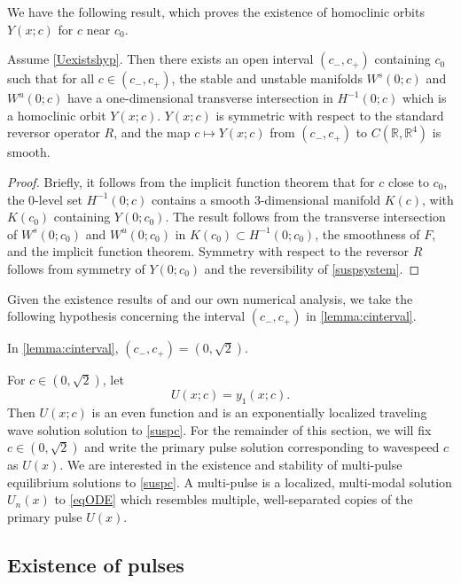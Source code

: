 \documentclass[review,onefignum,onetabnum]{siamart171218}
\newcommand{\R}{\mathbb{R}}
\begin{document}
We have the following result, which proves the existence of homoclinic orbits $Y(x; c)$ for $c$ near $c_0$.

\begin{lemma}\label{lemma:cinterval}
Assume \cref{Uexistshyp}. Then there exists an open interval $(c_-, c_+)$ containing $c_0$ such that for all $c \in (c_-, c_+)$, the stable and unstable manifolds $W^s(0; c)$ and $W^u(0; c)$ have a one-dimensional transverse intersection in $H^{-1}(0; c)$ which is a homoclinic orbit $Y(x; c)$. $Y(x; c)$ is symmetric with respect to the standard reversor operator $R$, and the map $c \mapsto Y(x; c)$ from $(c_-, c_+)$ to $C(\R, \R^4)$ is smooth.
\end{lemma}
\begin{proof}
Briefly, it follows from the implicit function theorem that for $c$ close to $c_0$, the 0-level set $H^{-1}(0; c)$ contains a smooth 3-dimensional manifold $K(c)$, with $K(c_0)$ containing $Y(0; c_0)$. The result follows from the transverse intersection of $W^s(0; c_0)$ and $W^u(0; c_0)$ in $K(c_0) \subset H^{-1}(0; c_0)$, the smoothness of $F$, and the implicit function theorem. Symmetry with respect to the reversor $R$ follows from symmetry of $Y(0; c_0)$ and the reversibility of \cref{suspsystem}.
\end{proof}

Given the existence results of \cite{Smets2002,Berg2018} and our own numerical analysis, we take the following hypothesis concerning the interval $(c_-, c_+)$ in \cref{lemma:cinterval}.
\begin{hypothesis}
In \cref{lemma:cinterval}, $(c_-, c_+) = (0, \sqrt{2})$.
\end{hypothesis}

For $c \in (0, \sqrt{2})$, let
\begin{equation}\label{suspU}
U(x; c) = y_1(x; c).
\end{equation}
Then $U(x; c)$ is an even function and is an exponentially localized traveling wave solution solution to \cref{suspc}. For the remainder of this section, we will fix $c \in (0, \sqrt{2})$ and write the primary pulse solution corresponding to wavespeed $c$ as $U(x)$. We are interested in the existence and stability of multi-pulse equilibrium solutions to \cref{suspc}. A multi-pulse is a localized, multi-modal solution $U_n(x)$ to \cref{eqODE} which resembles multiple, well-separated copies of the primary pulse $U(x)$.

\subsection{Existence of pulses}
\end{document}
